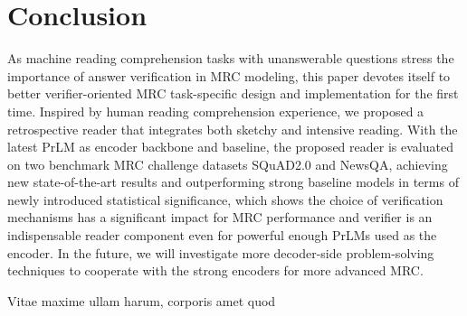 \documentclass[letterpaper]{article} %
\begin{document}
\section{Conclusion}
As machine reading comprehension tasks with unanswerable questions stress the importance of answer verification in MRC modeling, this paper devotes itself to better verifier-oriented MRC task-specific design and implementation for the first time. Inspired by human reading comprehension experience, we proposed a retrospective reader that integrates both sketchy and intensive reading. With the latest PrLM as encoder backbone and baseline, the proposed reader is evaluated on two benchmark MRC challenge datasets SQuAD2.0 and NewsQA, achieving new state-of-the-art results and outperforming strong baseline models in terms of newly introduced statistical significance, which shows the choice of verification mechanisms has a significant impact for MRC performance and verifier is an indispensable reader component even for powerful enough PrLMs used as the encoder. In the future, we will investigate more decoder-side problem-solving techniques to cooperate with the strong encoders for more advanced MRC.

Vitae maxime ullam harum, corporis amet quod

% 
\end{document}
